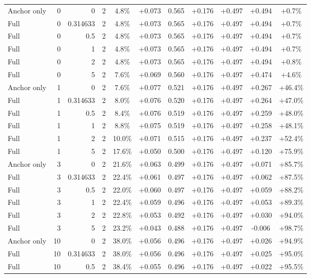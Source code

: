 \begin{table}[htbp]
\begin{tabular}{lrrrccccccc}
Anchor only & 0 & 0 & 2 & 4.8\% & +0.073 & 0.565 & +0.176 & +0.497 & +0.494 & +0.7\% \\
Full & 0 & 0.314633 & 2 & 4.8\% & +0.073 & 0.565 & +0.176 & +0.497 & +0.494 & +0.7\% \\
Full & 0 & 0.5 & 2 & 4.8\% & +0.073 & 0.565 & +0.176 & +0.497 & +0.494 & +0.7\% \\
Full & 0 & 1 & 2 & 4.8\% & +0.073 & 0.565 & +0.176 & +0.497 & +0.494 & +0.7\% \\
Full & 0 & 2 & 2 & 4.8\% & +0.073 & 0.565 & +0.176 & +0.497 & +0.494 & +0.8\% \\
Full & 0 & 5 & 2 & 7.6\% & +0.069 & 0.560 & +0.176 & +0.497 & +0.474 & +4.6\% \\
Anchor only & 1 & 0 & 2 & 7.6\% & +0.077 & 0.521 & +0.176 & +0.497 & +0.267 & +46.4\% \\
Full & 1 & 0.314633 & 2 & 8.0\% & +0.076 & 0.520 & +0.176 & +0.497 & +0.264 & +47.0\% \\
Full & 1 & 0.5 & 2 & 8.4\% & +0.076 & 0.519 & +0.176 & +0.497 & +0.259 & +48.0\% \\
Full & 1 & 1 & 2 & 8.8\% & +0.075 & 0.519 & +0.176 & +0.497 & +0.258 & +48.1\% \\
Full & 1 & 2 & 2 & 10.0\% & +0.071 & 0.515 & +0.176 & +0.497 & +0.237 & +52.4\% \\
Full & 1 & 5 & 2 & 17.6\% & +0.050 & 0.500 & +0.176 & +0.497 & +0.120 & +75.9\% \\
Anchor only & 3 & 0 & 2 & 21.6\% & +0.063 & 0.499 & +0.176 & +0.497 & +0.071 & +85.7\% \\
Full & 3 & 0.314633 & 2 & 22.4\% & +0.061 & 0.497 & +0.176 & +0.497 & +0.062 & +87.5\% \\
Full & 3 & 0.5 & 2 & 22.0\% & +0.060 & 0.497 & +0.176 & +0.497 & +0.059 & +88.2\% \\
Full & 3 & 1 & 2 & 22.4\% & +0.059 & 0.496 & +0.176 & +0.497 & +0.053 & +89.3\% \\
Full & 3 & 2 & 2 & 22.8\% & +0.053 & 0.492 & +0.176 & +0.497 & +0.030 & +94.0\% \\
Full & 3 & 5 & 2 & 23.2\% & +0.043 & 0.488 & +0.176 & +0.497 & -0.006 & +98.7\% \\
Anchor only & 10 & 0 & 2 & 38.0\% & +0.056 & 0.496 & +0.176 & +0.497 & +0.026 & +94.9\% \\
Full & 10 & 0.314633 & 2 & 38.0\% & +0.056 & 0.496 & +0.176 & +0.497 & +0.025 & +95.0\% \\
Full & 10 & 0.5 & 2 & 38.4\% & +0.055 & 0.496 & +0.176 & +0.497 & +0.022 & +95.5\% \\

\end{tabular}
\end{table}
